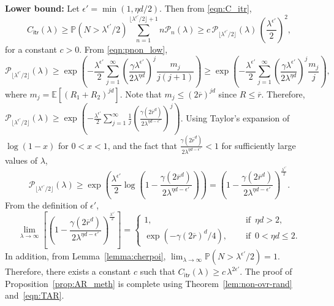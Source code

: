 \documentclass[11pt]{article}
\newcommand{\pp}{\mathbb{P}}
\newcommand{\ee}{\mathbb{E}}
\newcommand{\rbdd}{\overline{r}}
\newcommand{\lt}{\left}
\newcommand{\rt}{\right}
\newcommand{\pnon}{\mathcal{P}_n(\lambda)}
\begin{document}
\begin{appendices}
\noindent
{\bf Lower bound:} Let $\epsilon' = \min(1, \eta d/2)$. Then from \eqref{eqn:C_itr},
$$\displaystyle C_{\mathsf{itr}}(\lambda) \geq \pp\lt(N > \lambda^{\epsilon'}/2\rt) \sum_{n=1}^{ \lfloor\lambda^{\epsilon'}/2 \rfloor + 1} n \pnon \geq c \,\mathcal{P}_{\lfloor\lambda^{\epsilon'}/2 \rfloor}(\lambda)\,\lt(\frac{\lambda^{\epsilon'}}{2}\rt)^{2},$$ for a constant $c > 0$.
From \eqref{eqn:pnon_low},
\[
 \mathcal{P}_{\lfloor\lambda^{\epsilon'}/2 \rfloor}(\lambda) \geq \exp\lt(- \frac{\lambda^{\epsilon'}}{2}  \sum_{j=1}^\infty \lt(\frac{\gamma \lambda^{\epsilon'} }{2\lambda^{\eta d}} \rt)^j \frac{m_j}{j(j+1)}\rt) \geq \exp\lt(- \frac{\lambda^{\epsilon'}}{2}  \sum_{j=1}^\infty \lt(\frac{\gamma \lambda^{\epsilon'} }{2\lambda^{\eta d}} \rt)^j \frac{m_j}{j}\rt),
\]
where $m_j = \ee\lt[(R_1 + R_2)^{j d}\rt]$. Note that $m_j \leq (2\rbdd)^{jd}$ since $R \leq \rbdd$. Therefore,
$\displaystyle\mathcal{P}_{\lfloor\lambda^{\epsilon'}/2 \rfloor}(\lambda) \geq  \exp\lt(- \frac{\lambda^{\epsilon'}}{2}  \sum_{j=1}^\infty \frac{1 }{j} \lt( \frac{\gamma (2\rbdd^d) }{2\lambda^{\eta d - \epsilon'}} \rt)^j \rt)$.
Using Taylor's expansion of $\log(1 - x)$ for $0< x <1$, and the fact that $\frac{\gamma (2\rbdd^d) }{2\lambda^{\eta d - \epsilon'}} < 1 $ for sufficiently large values of $\lambda$,
$$\displaystyle\mathcal{P}_{\lfloor\lambda^{\epsilon'}/2 \rfloor}(\lambda) \geq \exp\lt(\frac{\lambda^{\epsilon'}}{2} \log\lt(1 - \frac{\gamma (2\rbdd^d) }{2\lambda^{\eta d - \epsilon'}} \rt) \rt) = \lt(1 - \frac{\gamma (2\rbdd^d) }{2\lambda^{\eta d - \epsilon'}} \rt)^{\frac{\lambda^{\epsilon'}}{2}}.$$
From the definition of $\epsilon'$,
\[
 \lim_{\lambda \rightarrow \infty} \lt[ \lt(1 - \frac{\gamma (2\rbdd^d) }{2\lambda^{\eta d - \epsilon'}} \rt)^{\frac{\lambda^{\epsilon'}}{2}}\rt] = \begin{cases}
                                                                                                                                              1, & \quad \text{ if }\, \eta d > 2,\\
                                                                                                                                              \exp\lt( - \gamma (2\rbdd)^d/4 \rt), & \quad \text{ if }\, 0 < \eta d \leq 2.
                                                                                                                                             \end{cases}
\]
{In addition, from  Lemma~\ref{lemma:cherpoi}, ${\lim_{\lambda \rightarrow \infty}\pp\lt(N > \lambda^{\epsilon'}/2\rt) = 1}$. Therefore,
there exists a constant $c$ such that ${C_{\mathsf{itr}}(\lambda) \geq c\, \lambda^{2\epsilon'}}$. }
The proof of Proposition~\ref{prop:AR_meth} is complete using Theorem~\ref{lem:non-ovr-rand} and~\eqref{eqn:TAR}.





\end{appendices}
\end{document}
